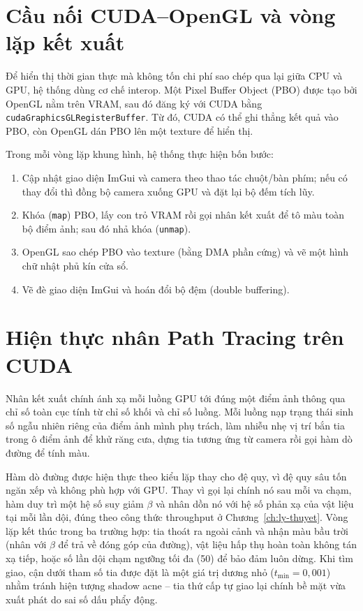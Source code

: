 \section{Cầu nối CUDA--OpenGL và vòng lặp kết xuất}
\label{sec:interop}
Để hiển thị thời gian thực mà không tốn chi phí sao chép qua lại giữa CPU và
GPU, hệ thống dùng cơ chế interop. Một Pixel Buffer Object (PBO)
được tạo bởi OpenGL nằm trên VRAM, sau đó đăng ký với CUDA bằng
\texttt{cudaGraphicsGLRegisterBuffer}. Từ đó, CUDA có thể ghi thẳng kết quả vào
PBO, còn OpenGL dán PBO lên một texture để hiển thị.

Trong mỗi vòng lặp khung hình, hệ thống thực hiện bốn bước:
\begin{enumerate}[noitemsep]
  \item Cập nhật giao diện ImGui và camera theo thao tác chuột/bàn phím; nếu có
        thay đổi thì đồng bộ camera xuống GPU và đặt lại bộ đếm tích lũy.
  \item Khóa (\texttt{map}) PBO, lấy con trỏ VRAM rồi gọi nhân kết xuất để tô
        màu toàn bộ điểm ảnh; sau đó nhả khóa (\texttt{unmap}).
  \item OpenGL sao chép PBO vào texture (bằng DMA phần cứng) và vẽ một hình chữ
        nhật phủ kín cửa sổ.
  \item Vẽ đè giao diện ImGui và hoán đổi bộ đệm (double buffering).
\end{enumerate}

\section{Hiện thực nhân Path Tracing trên CUDA}
Nhân kết xuất chính ánh xạ mỗi luồng GPU tới đúng một điểm ảnh thông qua chỉ số
toàn cục tính từ chỉ số khối và chỉ số luồng. Mỗi luồng nạp trạng thái sinh số
ngẫu nhiên riêng của điểm ảnh mình phụ trách, làm nhiễu nhẹ vị trí bắn tia trong
ô điểm ảnh để khử răng cưa, dựng tia tương ứng từ camera rồi gọi hàm dò đường để
tính màu.

Hàm dò đường được hiện thực theo kiểu lặp thay cho đệ quy, vì đệ quy sâu tốn ngăn
xếp và không phù hợp với GPU. Thay vì gọi lại chính nó sau mỗi va chạm, hàm duy
trì một hệ số suy giảm $\beta$ và nhân dồn nó với hệ số phản xạ của vật liệu tại
mỗi lần dội, đúng theo công thức throughput ở Chương~\ref{ch:ly-thuyet}. Vòng lặp
kết thúc trong ba trường hợp: tia thoát ra ngoài cảnh và nhận màu bầu trời (nhân
với $\beta$ để trả về đóng góp của đường), vật liệu hấp thụ hoàn toàn không tán
xạ tiếp, hoặc số lần dội chạm ngưỡng tối đa (50) để bảo đảm luôn dừng. Khi tìm
giao, cận dưới tham số tia được đặt là một giá trị dương nhỏ ($t_{\min}=0{,}001$)
nhằm tránh hiện tượng shadow acne -- tia thứ cấp tự giao lại chính bề mặt vừa
xuất phát do sai số dấu phẩy động.

